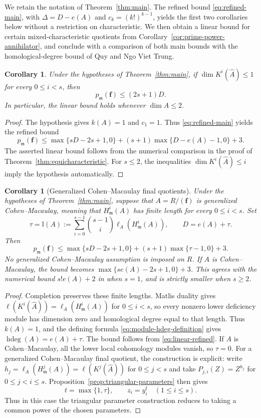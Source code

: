\documentclass[11pt,reqno]{amsart}
\numberwithin{equation}{section}
\newtheorem{corollary}[theorem]{Corollary}
\theoremstyle{definition}
\newcommand{\m}{\mathfrak m}
\newcommand{\f}{\mathbf f}
\newcommand{\hdeg}{\operatorname{hdeg}}
\begin{document}
We retain the notation of Theorem~\ref{thm:main}. The refined bound
\eqref{eq:refined-main}, with $\Delta=D-e(A)$ and $c_k=(k!)^{k-1}$,
yields the first two corollaries below without a restriction on
characteristic. We then obtain a linear bound for certain
mixed-characteristic quotients from
Corollary~\ref{cor:prime-power-annihilator}, and conclude with a
comparison of both main bounds with the homological-degree bound
of Quy and Ngo Viet Trung.

\begin{corollary}\label{cor:linear}
Under the hypotheses of Theorem~\ref{thm:main}, if $\dim K^i(\widehat A)\le1$ for every $0\le i<s$, then
\[
 p_{\m}(\f)\le(2s+1)D.
\]
In particular, the linear bound holds whenever $\dim A\le2$.
\end{corollary}
\begin{proof}
The hypothesis gives $k(A)=1$ and $c_1=1$. Thus
\eqref{eq:refined-main} yields the refined bound
\begin{equation}\label{eq:linear-refined}
 p_{\m}(\f)\le
 \max\{sD-2s+1,0\}+(s+1)\max\{D-e(A)-1,0\}+3.
\end{equation}
The asserted linear bound follows from the numerical comparison
in the proof of Theorem~\ref{thm:equicharacteristic}.
For $s\le2$, the inequalities $\dim K^i(\widehat A)\le i$ imply
the hypothesis automatically.
\end{proof}

\begin{corollary}[Generalized Cohen--Macaulay final quotients]
\label{cor:gcm-final-quotient}
Under the hypotheses of Theorem~\ref{thm:main}, suppose that $A=R/(\f)$
is generalized Cohen--Macaulay, meaning that $H^i_{\m}(A)$ has
finite length for every $0\le i<s$. Set
\[
 \tau=\mathbb I(A):=\sum_{i=0}^{s-1}\binom{s-1}{i}
                  \ell_A(H^i_{\m}(A)),\qquad D=e(A)+\tau.
\]
Then
\[
 p_{\m}(\f)\le\max\{sD-2s+1,0\}+(s+1)\max\{\tau-1,0\}+3.
\]
No generalized Cohen--Macaulay assumption is imposed on $R$.
If $A$ is Cohen--Macaulay, the bound becomes
$\max\{se(A)-2s+1,0\}+3$. This agrees with the numerical bound
$s!e(A)+2$ in \cite[Proposition~1]{ST97} when $s=1$, and is
strictly smaller when $s\ge2$.
\end{corollary}
\begin{proof}
Completion preserves these finite lengths. Matlis duality gives
$\ell(K^i(\widehat A))=\ell_A(H^i_{\m}(A))$ for $0\le i<s$, so every
nonzero lower deficiency module has dimension zero and homological
degree equal to that length. Thus $k(A)=1$, and the defining formula
\eqref{eq:module-hdeg-definition} gives $\hdeg(A)=e(A)+\tau$.
The bound follows from \eqref{eq:linear-refined}.
If $A$ is Cohen--Macaulay, all the lower local cohomology modules
vanish, so $\tau=0$.
For a generalized Cohen--Macaulay final quotient, the construction
is explicit:
write $h_j=\ell_A(H^j_{\m}(A))=\ell(K^j(\widehat A))$ for $0\le j<s$
and take $P_{j,i}(Z)=Z^{h_j}$ for $0\le j<i\le s$. Proposition~\ref{prop:triangular-parameters}
then gives
\[
 t=\max\{1,\tau\},\qquad z_i=y_i^t\quad(1\le i\le s).
\]
Thus in this case the triangular parameter construction reduces to
taking a common power of the chosen parameters.
\end{proof}
\end{document}
